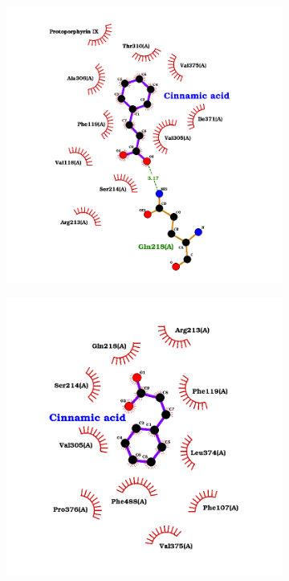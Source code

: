 \documentclass[12pt]{article}
\begin{document}
	
	\FloatBarrier
	\begin{figure}[H]
		\centering
		\begin{subfigure}[H]{0.35\textwidth}
			\hspace{2cm}
			\includegraphics[width=\textwidth]{../2/Dock/Dock2/best.png}
			\caption{}
		\end{subfigure}
		\hfill
		\begin{subfigure}[H]{0.35\textwidth}
			\hspace{-2cm}
			\includegraphics[width=\textwidth]{../2/Dock/Dock2/best2.png}

\end{subfigure}
\end{figure}
\end{document}
